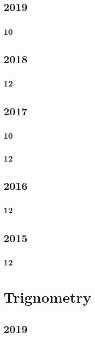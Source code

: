 \documentclass[11pt]{book}
\begin{document}
\section{2019}
\subsection{10}


\section{2018}
\subsection{12}




\section{2017}
\subsection{10}

\subsection{12}



\section{2016}
\subsection{12}


\section{2015}
\subsection{12}






\chapter{Trignometry}
\section{2019}
\end{document}

